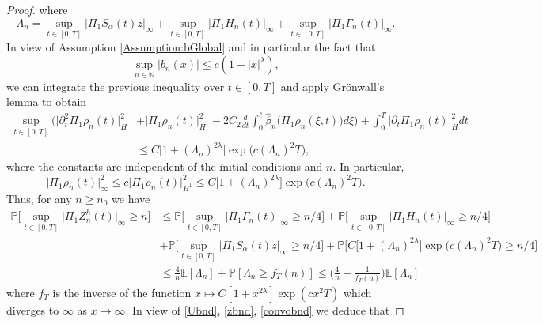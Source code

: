 \documentclass[10pt, reqno]{amsart}
\newcommand{\N}{\mathbb{N}}
\newcommand{\pr}{\mathbb{P}}
\newcommand{\ex}{\mathbb{E}}
\theoremstyle{definition}
\numberwithin{lem}{section}
\numberwithin{cor}{section}
\numberwithin{prop}{section}
\numberwithin{thm}{section}
\numberwithin{dfn}{section}
\begin{document}
\begin{proof}
    	   \noindent where $$ \Lambda_n=\sup_{t\in[0,T]}|\Pi_1S_\alpha(t)z|_{\infty}+\sup_{t\in[0,T]}|\Pi_1H_{n}(t)|_{\infty}+\sup_{t\in[0,T]}|\Pi_1\Gamma_{n}(t)|_{\infty}.$$
    	   In view of Assumption \ref{Assumption:bGlobal} and in particular the fact that 
    	   $$\sup_{n\in\N}|b_n(x)|\leq c(1+|x|^{\lambda}),$$
    	   we can integrate the previous inequality over $t\in[0,T]$ and apply Gr\"onwall's lemma to  obtain
    	     \begin{equation*}
    	   \begin{aligned}
    	  \sup_{t\in[0,T]}\bigg(\big|\partial^2_t\Pi_1 \rho_{n}(t)\big|^2_{H}&+\big| \Pi_1\rho_{n}(t)\big|^2_{H^1}-2C_2\frac{d}{dt}\int_{0}^{\ell}\hat{\beta}_n\big( \Pi_1\rho_n(\xi, t) \big)d\xi\bigg)
    	  +\int_{0}^{T}\big|\partial_t\Pi_1 \rho_{n}(t)\big|^2_{H}dt\\&\leq C\bigg[1+(\Lambda_n)^{2\lambda}   \bigg]\exp\bigg( c(\Lambda_n)^{2}T   \bigg),
    	   \end{aligned}
    	   \end{equation*}
    	   where the constants are independent of the initial conditions and $n$. In particular,
    	   \begin{equation*}\label{rhobnd}
    	   \big| \Pi_1\rho_{n}(t)\big|^2_{\infty}\leq c\big|  \Pi_1\rho_{n}(t)\big|^2_{H^1}\leq     	   C\bigg[1+(\Lambda_n)^{2\lambda}   \bigg]\exp\bigg( c(\Lambda_n)^{2}T   \bigg).
    	   \end{equation*}
    	   Thus, for any $n\geq n_0$ we have 
    	   \begin{equation*}
    	   \begin{aligned} 
    	   \pr\bigg[  \sup_{t\in[0,T]}\big|   \Pi_1Z_{n}^{h}(t)\big|_{\infty}\geq n   \bigg]&\leq \pr\bigg[ \sup_{t\in[0,T]}|\Pi_1\Gamma_{n}(t)|_{\infty}\geq n/4 \bigg]+\pr\bigg[  \sup_{t\in[0,T]}|\Pi_1H_{n}(t)|_{\infty}\geq n/4 \bigg]\\&
    	   +\pr\bigg[\sup_{t\in[0,T]}|\Pi_1S_\alpha(t)z|_{\infty}\geq n/4\bigg]+\pr\bigg[C\bigg[1+(\Lambda_n)^{2\lambda}   \bigg]\exp\bigg( c(\Lambda_n)^{2}T\bigg)\geq n/4\bigg]\\&
    	   \leq \frac{4}{n}\ex[\Lambda_n ]+\pr[  \Lambda_n\geq f_T(n)   ]\leq \bigg(\frac{4}{n}+\frac{1}{f_T(n)}\bigg)\ex[\Lambda_n]
    	   \end{aligned}
    	   \end{equation*}
    	   where $f_T$ is the inverse of the function $x\mapsto C[1+x^{2\lambda } ]\exp( cx^{2}T)$
    	   which diverges to $\infty$ as $x\to\infty.$ In view of \eqref{Ubnd}, \eqref{zbnd}, \eqref{convobnd} we deduce that 

\end{proof}
\end{document}
